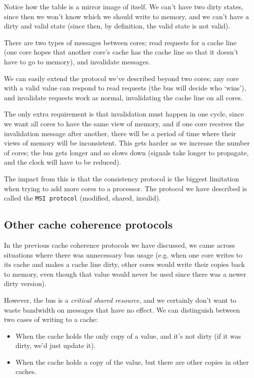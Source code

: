 Notice how the table is a mirror image of itself. We can't have two dirty
states, since then we won't know which we should write to memory, and we can't
have a dirty and valid state (since then, by definition, the valid state is not
valid).



There are two types of messages between cores; read requests for a cache line
(one core hopes that another core's cache has the cache line so that it doesn't
have to go to memory), and invalidate messages.

We can easily extend the protocol we've described beyond two cores; any core
with a valid value can respond to read requests (the bus will decide who
`wins'), and invalidate requests work as normal, invalidating the cache line on
all cores.

The only extra requirement is that invalidation must happen in one cycle, since
we want all cores to have the same view of memory, and if one core receives the
invalidation message after another, there will be a period of time where their
views of memory will be inconsistent. This gets harder as we increase the number
of cores; the bus gets longer and so slows down (signals take longer to
propagate, and the clock will have to be reduced).

The impact from this is that the consistency protocol is the biggest limitation
when trying to add more cores to a processor. The protocol we have described is
called the \texttt{MSI protocol} (modified, shared, invalid).

\subsection{Other cache coherence protocols}

In the previous cache coherence protocols we have discussed, we came across
situations where there was unnecessary bus usage (e.g. when one core writes to
its cache and makes a cache line dirty, other cores would write their copies
back to memory, even though that value would never be used since there was a
newer dirty version).

However, the bus is a \textit{critical shared resource}, and we certainly don't
want to waste bandwidth on messages that have no effect. We can distinguish
between two cases of writing to a cache:

\begin{itemize}
  \item When the cache holds the only copy of a value, and it's not dirty (if it
  was dirty, we'd just update it).
  \item When the cache holds a copy of the value, but there are other copies in
  other caches.
\end{itemize}

